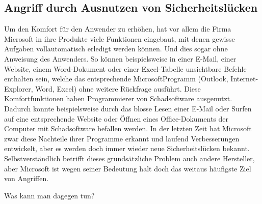 \subsection{Angriff durch Ausnutzen von Sicherheitslücken}

Um den Komfort für den Anwender zu erhöhen, hat vor allem die Firma Microsoft in ihre Produkte viele Funktionen eingebaut,
mit denen gewisse Aufgaben vollautomatisch erledigt werden können. Und dies sogar ohne Anweisung des Anwenders. So können beispielsweise
in einer E-Mail, einer Website, einem Word-Dokument oder einer Excel-Tabelle unsichtbare Befehle enthalten sein, welche das entsprechende
MicrosoftProgramm (Outlook, Internet-Explorer, Word, Excel) ohne weitere Rückfrage ausführt. Diese Komfortfunktionen haben
Programmierer von Schadsoftware ausgenutzt. Dadurch konnte beispielsweise durch das blosse Lesen einer E-Mail oder Surfen auf eine
entsprechende Website oder Öffnen eines Office-Dokuments der Computer mit Schadsoftware befallen werden. In der letzten Zeit hat
Microsoft zwar diese Nachteile ihrer Programme erkannt und laufend Verbesserungen entwickelt, aber es werden doch immer wieder neue
Sicherheitslücken bekannt. Selbstverständlich betrifft dieses grundsätzliche Problem auch andere Hersteller, aber Microsoft ist wegen
seiner Bedeutung halt doch das weitaus häufigste Ziel von Angriffen.

Was kann man dagegen tun?

